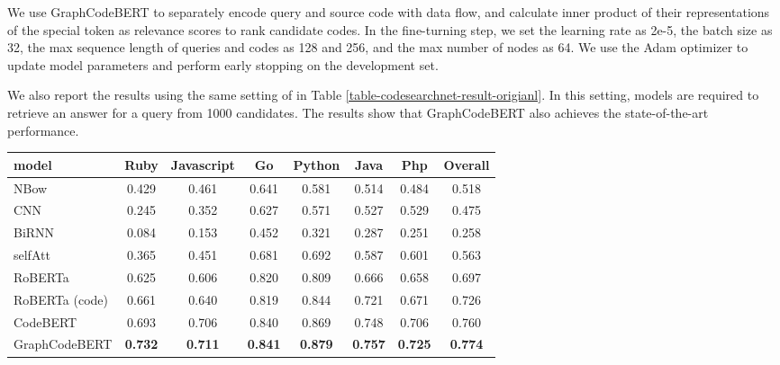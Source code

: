 \documentclass{article} \usepackage{iclr2021_conference,times}
\begin{document}
We use GraphCodeBERT to separately encode query and source code with data flow, and calculate inner product of their representations of the special token  as relevance scores to rank candidate codes.  In the fine-turning step, we set the learning rate as 2e-5, the batch size as 32, the max sequence length of queries and codes as 128 and 256, and the max number of nodes as 64. We use the Adam optimizer to update model parameters and perform early stopping on the development set.

We also report the results using the same setting of \citet{husain2019codesearchnet} in Table \ref{table-codesearchnet-result-origianl}. In this setting, models are required to retrieve an answer for a query from 1000 candidates. The results show that GraphCodeBERT also achieves the state-of-the-art performance.
\begin{table*}[h]
	\begin{center}
		\begin{small}
				\begin{tabular}{lccccccc}
					\toprule
model & Ruby & Javascript & Go & Python & Java & Php & Overall\\
					\midrule
NBow & 0.429 & 0.461 & 0.641& 0.581 & 0.514 & 0.484 & 0.518\\
					CNN & 0.245 & 0.352 & 0.627 & 0.571 & 0.527 & 0.529 & 0.475\\
					BiRNN & 0.084 & 0.153 & 0.452 & 0.321 & 0.287 & 0.251 & 0.258\\
					selfAtt & 0.365 & 0.451 & 0.681 & 0.692& 0.587 & 0.601 & 0.563\\
					\hline
					RoBERTa & 0.625 & 0.606 & 0.820 & 0.809 & 0.666 & 0.658 & 0.697 \\
					RoBERTa (code)  & 0.661& 0.640&0.819& 0.844&0.721 & 0.671& 0.726\\
					CodeBERT& 0.693 & 0.706 &0.840 & 0.869 &0.748 & 0.706 & 0.760\\
					GraphCodeBERT  & \bf{0.732} & \bf{0.711} &\bf{0.841} & \bf{0.879} &\bf{0.757} & \bf{0.725} & \bf{0.774}\\
					\bottomrule
				\end{tabular}
    \caption{Results on natural language code search using the setting of \citet{husain2019codesearchnet}. }
    	\label{table-codesearchnet-result-origianl}
		\end{small}
	\end{center}
	\vskip -0.2in
\end{table*}
\end{document}
